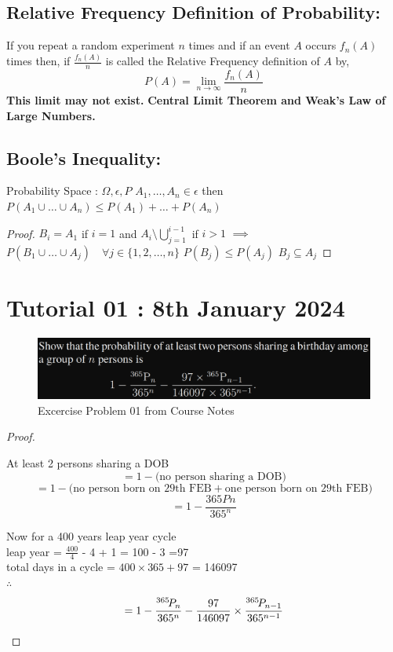 \documentclass{article}
\newcommand*{\permcomb}[4][0mu]{{{}^{#3}\mkern#1#2_{#4}}}
\newcommand*{\perm}[1][-3mu]{\permcomb[#1]{P}}
\theoremstyle{definition}
\begin{document}
\subsection{Relative Frequency Definition of Probability:}
    If you repeat a random experiment $n$ times and if an event $A$ occurs $f_n(A)$ times then, if $\frac{f_n(A)}{n}$ is called the Relative Frequency definition of $A$ by,
    \begin{equation}
        P(A) = \lim_{n \to \infty} \frac{f_n(A)}{n}
    \end{equation}
    \textbf{This limit may not exist.}
\textbf{Central Limit Theorem and Weak's Law of Large Numbers.}
    

\subsection{Boole's Inequality:}
Probability Space : $\Omega, \epsilon, P$
$A_1, \dots, A_n \in \epsilon$ then $P(A_1 \cup \dots \cup A_n) \leq P(A_1) + \dots + P(A_n)$

\begin{proof}
$B_i = A_1$ if $i=1$ and $A_i \setminus \bigcup_{j=1}^{i-1}$ if $i>1$ $\implies$
$P(B_1 \cup \dots \cup A_j) \quad \forall j \in \{1,2 , \dots , n\}$
$P(B_j) \leq P(A_j)$
$B_j \subseteq A_j$
\end{proof}

\section{Tutorial 01 : 8th January 2024}
\begin{figure}[h]
    \centering
    \includegraphics[scale=0.4]{ex01.png}
    \caption{Excercise Problem 01 from Course Notes}
    \label{fig:enter-label}
\end{figure}

\begin{proof}
\begin{center}
    
    At least 2 persons sharing a DOB
    $$=1- \text{(no person sharing a DOB)}$$
    $$= 1- \text{(no person born on 29th FEB} + \text{one person born on 29th FEB)}$$
    $$= 1 - \frac{365Pn}{365^n}$$

    Now for a 400 years leap year cycle\\
    leap year = $\frac{400}{4}$ - 4 + 1 = 100 - 3 =97\\
    total days in a cycle = $400 \times 365 + 97$ = 146097\\
    $\therefore$
    $$= 1 - \frac{\perm{365}{n}}{365^n} - \frac{97}{146097}\times \frac{\perm{365}{n-1}}{365^{n-1}}$$

    
\end{center}
\end{proof}
\end{document}
